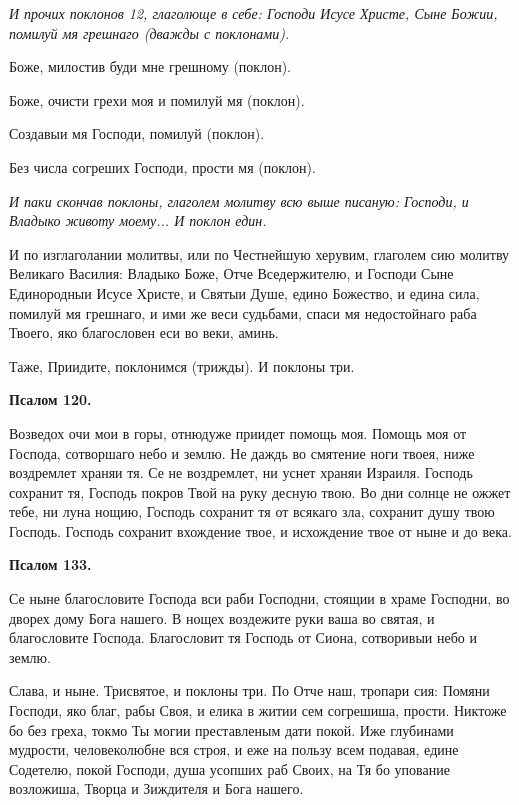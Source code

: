 \itshape И прочих поклонов 12, глаголюще в себе:\normalfont{} Господи Исусе Христе, Сыне Божии, помилуй мя грешнаго (дважды с поклонами).

Боже, милостив буди мне грешному (поклон).

Боже, очисти грехи моя и помилуй мя (поклон).

Создавыи мя Господи, помилуй (поклон).

Без числа согреших Господи, прости мя (поклон).

\itshape И паки скончав поклоны, глаголем молитву всю выше писаную:\normalfont{} Господи, и Владыко животу моему... И поклон един. 


И по изглаголании молитвы, или по Честнейшую херувим, глаголем сию молитву Великаго Василия: Владыко Боже, Отче Вседержителю, и Господи Сыне Единородныи Исусе Христе, и Святыи Душе, едино Божество, и едина сила, помилуй мя грешнаго, и ими же веси судьбами, спаси мя недостойнаго раба Твоего, яко благословен еси во веки, аминь. 


Таже, Приидите, поклонимся (трижды). И поклоны три. 


\medskip


\bfseries Псалом 120.\normalfont{}


Возведох очи мои в горы, отнюдуже приидет помощь моя. Помощь моя от Господа, сотворшаго небо и землю. Не даждь во смятение ноги твоея, ниже воздремлет храняи тя. Се не воздремлет, ни уснет храняи Израиля. Господь сохранит тя, Господь покров Твой на руку десную твою. Во дни солнце не ожжет тебе, ни луна нощию, Господь сохранит тя от всякаго зла, сохранит душу твою Господь. Господь сохранит вхождение твое, и исхождение твое от ныне и до века.


\medskip


\bfseries Псалом 133.\normalfont{}


Се ныне благословите Господа вси раби Господни, стоящии в храме Господни, во дворех дому Бога нашего. В нощех воздежите руки ваша во святая, и благословите Господа. Благословит тя Господь от Сиона, сотворивыи небо и землю. 

Слава, и ныне. Трисвятое, и поклоны три. По Отче наш, тропари сия: Помяни Господи, яко благ, рабы Своя, и елика в житии сем согрешиша, прости. Никтоже бо без греха, токмо Ты могии преставленым дати покой. Иже глубинами мудрости, человеколюбне вся строя, и еже на пользу всем подавая, едине Содетелю, покой Господи, душа усопших раб Своих, на Тя бо упование возложиша, Творца и Зиждителя и Бога нашего. 

